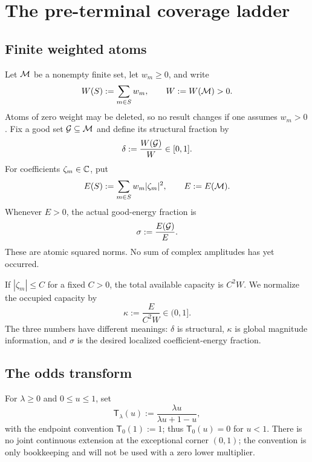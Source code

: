 \section{The pre-terminal coverage ladder}
\label{sec:coverage-ladder}

\subsection{Finite weighted atoms}

Let \(\mathcal M\) be a nonempty finite set, let \(w_m\ge0\), and write
\[
 W(S):=\sum_{m\in S}w_m,
 \qquad W:=W(\mathcal M)>0.
\]
Atoms of zero weight may be deleted, so no result changes if one assumes
\(w_m>0\).  Fix a good set \(\mathcal G\subseteq\mathcal M\) and define its structural
fraction by
\begin{equation}
 \delta:=\frac{W(\mathcal G)}{W}\in[0,1].
 \label{eq:tpc54-delta}
\end{equation}
For coefficients \(\zeta_m\in\mathbb C\), put
\begin{equation}
 E(S):=\sum_{m\in S}w_m|\zeta_m|^2,
 \qquad E:=E(\mathcal M).
 \label{eq:tpc54-energy}
\end{equation}
Whenever \(E>0\), the actual good-energy fraction is
\begin{equation}
 \sigma:=\frac{E(\mathcal G)}{E}.
 \label{eq:tpc54-sigma}
\end{equation}
These are atomic squared norms.  No sum of complex amplitudes has yet
occurred.

If \(|\zeta_m|\le C\) for a fixed \(C>0\), the total available capacity is
\(C^2W\).  We normalize the occupied capacity by
\begin{equation}
 \kappa:=\frac{E}{C^2W}\in(0,1].
 \label{eq:tpc54-kappa}
\end{equation}
The three numbers have different meanings: \(\delta\) is structural,
\(\kappa\) is global magnitude information, and \(\sigma\) is the desired
localized coefficient-energy fraction.

\subsection{The odds transform}

For \(\lambda\ge0\) and \(0\le u\le1\), set
\begin{equation}
 \mathsf T_\lambda(u)
 :=\frac{\lambda u}{\lambda u+1-u},
 \label{eq:tpc54-T-def}
\end{equation}
with the endpoint convention \(\mathsf T_0(1):=1\); thus
\(\mathsf T_0(u)=0\) for \(u<1\).  There is no joint continuous extension
at the exceptional corner \((0,1)\); the convention is only bookkeeping
and will not be used with a zero lower multiplier.

